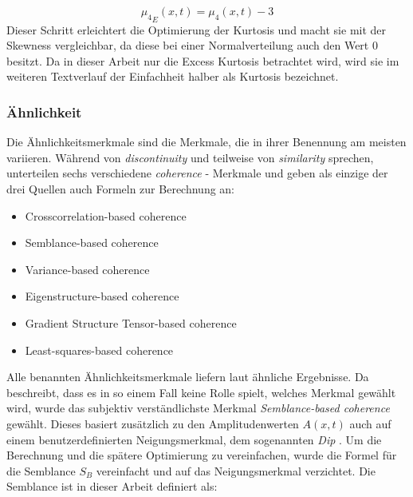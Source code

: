 \begin{equation}
    {\mu_4}_{E}(x,t) = \mu_4(x,t) - 3
\end{equation}
Dieser Schritt erleichtert die Optimierung der Kurtosis und macht sie mit der Skewness vergleichbar, da diese bei einer Normalverteilung auch den Wert 0 besitzt. Da in dieser Arbeit nur die Excess Kurtosis betrachtet wird, wird sie im weiteren Textverlauf der Einfachheit halber als Kurtosis bezeichnet.\\

%

\subsubsection{Ähnlichkeit}

Die Ähnlichkeitsmerkmale sind die Merkmale, die in ihrer Benennung am meisten variieren. Während \textcite{barnes_too_2006} von \textit{discontinuity} und \textcite{roden_geologic_2015} teilweise von \textit{similarity} sprechen, unterteilen \textcite{chopra_seismic_2007} sechs verschiedene \textit{coherence} - Merkmale und geben als einzige der drei Quellen auch Formeln zur Berechnung an:

\begin{itemize}
    \item Crosscorrelation-based coherence
    \item Semblance-based coherence
    \item Variance-based coherence
    \item Eigenstructure-based coherence
    \item Gradient Structure Tensor-based coherence
    \item Least-squares-based coherence
\end{itemize}
Alle benannten Ähnlichkeitsmerkmale liefern laut \textcite[Abb. 25]{chopra_seismic_2007} ähnliche Ergebnisse. Da \textcite{barnes_too_2006} beschreibt, dass es in so einem Fall keine Rolle spielt, welches Merkmal gewählt wird, wurde das subjektiv verständlichste Merkmal \textit{Semblance-based coherence} gewählt. Dieses basiert zusätzlich zu den Amplitudenwerten $A(x,t)$ auch auf einem benutzerdefinierten Neigungsmerkmal, dem sogenannten \textit{Dip} \parencite{chopra_seismic_2007}. Um die Berechnung und die spätere Optimierung zu vereinfachen, wurde die Formel für die Semblance $S_B$ vereinfacht und auf das Neigungsmerkmal verzichtet. Die Semblance ist in dieser Arbeit definiert als:

